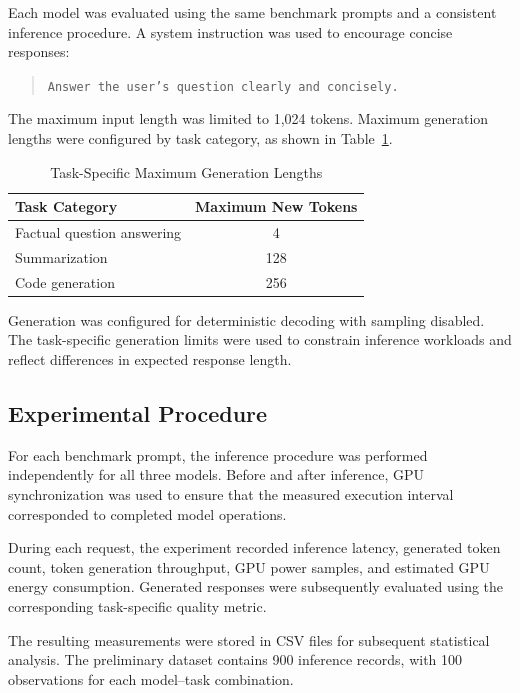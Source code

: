 \documentclass[conference]{IEEEtran}
\begin{document}
Each model was evaluated using the same benchmark prompts and a
consistent inference procedure. A system instruction was used to
encourage concise responses:

\begin{quote}
\texttt{Answer the user's question clearly and concisely.}
\end{quote}

The maximum input length was limited to 1,024 tokens. Maximum
generation lengths were configured by task category, as shown in
Table~\ref{tab:generation-limits}.

\begin{table}[t]
\caption{Task-Specific Maximum Generation Lengths}
\label{tab:generation-limits}
\centering
\begin{tabular}{lc}
\toprule
\textbf{Task Category} & \textbf{Maximum New Tokens} \\
\midrule
Factual question answering & 4 \\
Summarization & 128 \\
Code generation & 256 \\
\bottomrule
\end{tabular}
\end{table}

Generation was configured for deterministic decoding with sampling
disabled. The task-specific generation limits were used to constrain
inference workloads and reflect differences in expected response
length.

\subsection{Experimental Procedure}

For each benchmark prompt, the inference procedure was performed
independently for all three models. Before and after inference, GPU
synchronization was used to ensure that the measured execution
interval corresponded to completed model operations.

During each request, the experiment recorded inference latency,
generated token count, token generation throughput, GPU power samples,
and estimated GPU energy consumption. Generated responses were
subsequently evaluated using the corresponding task-specific quality
metric.

The resulting measurements were stored in CSV files for subsequent
statistical analysis. The preliminary dataset contains 900 inference
records, with 100 observations for each model--task combination.
\end{document}

